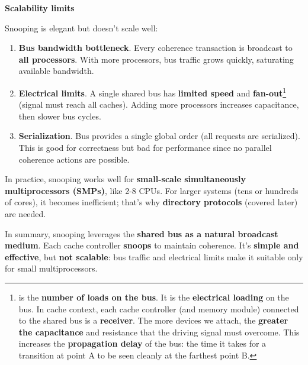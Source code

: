 \highspace
\begin{flushleft}
    \textcolor{Red2}{ \textbf{Scalability limits}}
\end{flushleft}
Snooping is elegant but doesn't scale well:
\begin{enumerate}
    \item \textbf{Bus bandwidth bottleneck}. Every coherence transaction is broadcast to \textbf{all processors}. With more processors, bus traffic grows quickly, saturating available bandwidth.
    \item \textbf{Electrical limits}. A single shared bus has \textbf{limited speed} and \textbf{fan-out}\footnote{%
         is the \textbf{number of loads on the bus}. It is the \textbf{electrical loading} on the bus. In cache context, each cache controller (and memory module) connected to the shared bus is a \textbf{receiver}. The more devices we attach, the \textbf{greater the capacitance} and resistance that the driving signal must overcome. This increases the \textbf{propagation delay} of the bus: the time it takes for a transition at point A to be seen cleanly at the farthest point B.
    } (signal must reach all caches). Adding more processors increases capacitance, then slower bus cycles.
    \item \textbf{Serialization}. Bus provides a single global order (all requests are serialized). This is good for correctness but bad for performance since no parallel coherence actions are possible.
\end{enumerate}
In practice, snooping works well for \textbf{small-scale simultaneously multiprocessors (SMPs)}, like 2-8 CPUs. For larger systems (tens or hundreds of cores), it becomes inefficient; that's why \textbf{directory protocols} (covered later) are needed.

\highspace
In summary, snooping leverages the \textbf{shared bus as a natural broadcast medium}. Each cache controller \textbf{snoops} to maintain coherence. It's \textbf{simple and effective}, but \textbf{not scalable}: bus traffic and electrical limits make it suitable only for small multiprocessors.